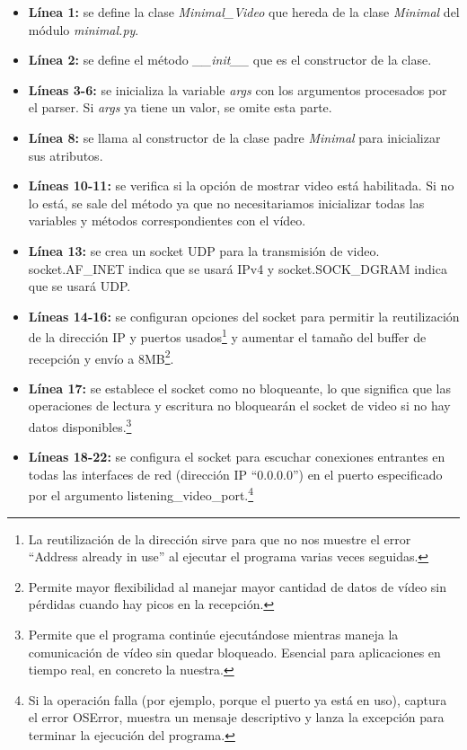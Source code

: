 \begin{itemize}
    \item \textbf{Línea 1:} se define la clase \textit{Minimal\_Video} que hereda de la clase \textit{Minimal} del módulo \textit{minimal.py}.
    \item \textbf{Línea 2:} se define el método \textit{\_\_init\_\_} que es el constructor de la clase.
    \item \textbf{Líneas 3-6:} se inicializa la variable \textit{args} con los argumentos procesados por el parser. Si \textit{args} ya tiene un valor, se omite esta parte.
    \item \textbf{Línea 8:} se llama al constructor de la clase padre \textit{Minimal} para inicializar sus atributos.
    \item \textbf{Líneas 10-11:} se verifica si la opción de mostrar video está habilitada. Si no lo está, se sale del método ya que no necesitariamos inicializar todas las variables y métodos correspondientes con el vídeo.
    \item \textbf{Línea 13:} se crea un socket UDP para la transmisión de video. socket.AF\_INET indica que se usará IPv4 y socket.SOCK\_DGRAM indica que se usará UDP.
    \item \textbf{Líneas 14-16:} se configuran opciones del socket para permitir la reutilización de la dirección IP y puertos usados\footnote{La reutilización de la dirección sirve para que no nos muestre el error ``Address already in use'' al ejecutar el programa varias veces seguidas.} y aumentar el tamaño del buffer de recepción y envío a 8MB\footnote{Permite mayor flexibilidad al manejar mayor cantidad de datos de vídeo sin pérdidas cuando hay picos en la recepción.}.
    \item \textbf{Línea 17:} se establece el socket como no bloqueante, lo que significa que las operaciones de lectura y escritura no bloquearán el socket de video si no hay datos disponibles.\footnote{Permite que el programa continúe ejecutándose mientras maneja la comunicación de vídeo sin quedar bloqueado. Esencial para aplicaciones en tiempo real, en concreto la nuestra.}
    \item \textbf{Líneas 18-22:} se configura el socket para escuchar conexiones entrantes en todas las interfaces de red (dirección IP ``0.0.0.0'') en el puerto especificado por el argumento listening\_video\_port.\footnote{ Si la operación falla (por ejemplo, porque el puerto ya está en uso), captura el error OSError, muestra un mensaje descriptivo y lanza la excepción para terminar la ejecución del programa.}

\end{itemize}
